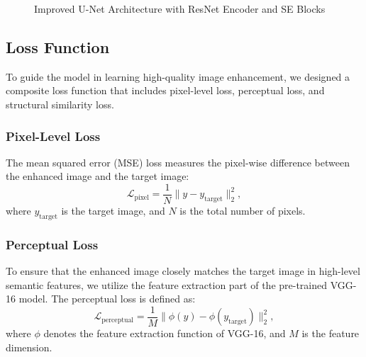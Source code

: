 \documentclass{apmcmthesis}
\begin{document}
\begin{figure}[ht]
    \caption{Improved U-Net Architecture with ResNet Encoder and SE Blocks}
    \label{fig:model_architecture}
\end{figure}

\subsection{Loss Function}
To guide the model in learning high-quality image enhancement, we designed a composite loss function that includes pixel-level loss, perceptual loss, and structural similarity loss.

\subsubsection{Pixel-Level Loss}
The mean squared error (MSE) loss measures the pixel-wise difference between the enhanced image and the target image:
\[
\mathcal{L}_{\text{pixel}} = \frac{1}{N} \| y - y_{\text{target}} \|_2^2,
\]
where $y_{\text{target}}$ is the target image, and $N$ is the total number of pixels.

\subsubsection{Perceptual Loss}
To ensure that the enhanced image closely matches the target image in high-level semantic features, we utilize the feature extraction part of the pre-trained VGG-16 model. The perceptual loss is defined as:
\[
\mathcal{L}_{\text{perceptual}} = \frac{1}{M} \| \phi(y) - \phi(y_{\text{target}}) \|_2^2,
\]
where $\phi$ denotes the feature extraction function of VGG-16, and $M$ is the feature dimension.
\end{document}
